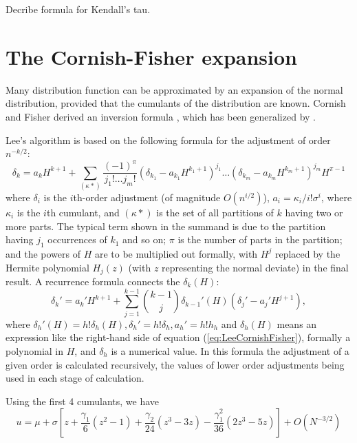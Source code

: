 Decribe formula for Kendall's tau.

\newpage
\section{The Cornish-Fisher expansion}

Many distribution function can be approximated by an expansion of the normal distribution, provided that the cumulants of the distribution are known. Cornish and Fisher derived an inversion formula \citep{fisher_percentile_1960}, which has been generalized by \cite{Lee_1992}.


Lee's algorithm is based on the following formula for the adjustment of order $n^{-k/2}$:
\begin{equation}
	\delta_k = a_k H^{k+1} + \sum_{(\kappa*)} \frac{(-1)^{\pi}}{j_1!\ldots j_m!} \left(\delta_{k_1} - a_{k_1} H^{k_1+1}\right)^{j_1} \ldots \left(\delta_{k_m} - a_{k_m} H^{k_m+1}\right)^{j_m} H^{\pi-1} \label{eq:LeeCornishFisher}
\end{equation}
where $\delta_i$ is the $i$th-order adjustment (of magnitude $O(n^{i/2})$), $a_i=\kappa_i/i! \sigma^i$, where $\kappa_i$ is the $i$th cumulant, and $(\kappa*)$ is the set of all partitions of $k$ having two or more parts. The typical term shown in the summand is due to the partition having $j_1$ occurrences of $k_1$ and so on; $\pi$ is the number of parts in the partition; and the powers of $H$ are to be multiplied out formally, with $H^j$ replaced by the Hermite polynomial $H_j(z)$ (with $z$ representing the normal deviate) in the final result.
A recurrence formula connects the $\delta_k(H)$:
\begin{equation}
	\delta_k' = a_k' H^{k+1} + \sum_{j=1}^{k-1} \binom{k-1}{j} \delta_{k-1}' (H) (\delta_j' - a_j' H^{j+1}),
\end{equation}
where $\delta_h'(H) = h! \delta_h(H), \delta_h'=h!\delta_h, a_h'=h!h_h$ and $\delta_h(H)$ means an expression like the right-hand side of equation (\ref{eq:LeeCornishFisher}), formally a polynomial in $H$, and $\delta_h$ is a numerical value. In this formula the adjustment of a given order is calculated recursively, the values of lower order adjustments being used in each stage of calculation.



Using the first 4 cumulants, we have
\begin{equation}
	u = \mu + \sigma \left[z + \frac{\gamma_1}{6}(z^2-1) + \frac{\gamma_2}{24}(z^3 - 3z) -  \frac{\gamma_1^2}{36}(2z^3-5z)\right] + O(N^{-3/2}) 
\end{equation}






